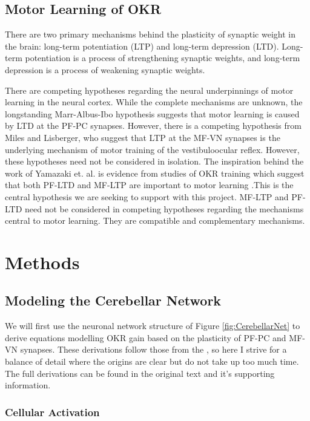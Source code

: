 \documentclass[10pt]{article}
\begin{document}
\subsection{Motor Learning of OKR}

There are two primary mechanisms behind the plasticity of synaptic weight in the brain: long-term potentiation (LTP) and long-term depression (LTD). Long-term potentiation is a process of strengthening synaptic weights, and long-term depression is a process of weakening synaptic weights.

There are competing hypotheses regarding the neural underpinnings of motor learning in the neural cortex.  While the complete mechanisms are unknown, the longstanding Marr-Albus-Ibo hypothesis suggests that motor learning is caused by LTD at the PF-PC synapses. However, there is a competing hypothesis from Miles and Lisberger, who suggest that LTP at the MF-VN synapses is the underlying mechanism of motor training of the vestibuloocular reflex. However, these hypotheses need not be considered in isolation. The inspiration behind the work of Yamazaki et. al. is evidence from studies of OKR training which suggest that both PF-LTD and MF-LTP are important to motor learning \cite{yamazaki2015modeling}.This is the central hypothesis we are seeking to support with this project. MF-LTP and PF-LTD need not be considered in competing hypotheses regarding the mechanisms central to motor learning. They are compatible and complementary mechanisms.

\section{Methods}

\subsection{Modeling the Cerebellar Network}

We will first use the neuronal network structure of Figure \ref{fig:CerebellarNet} to derive equations modelling OKR gain based on the plasticity of PF-PC and MF-VN synapses. These derivations follow those from the \cite{yamazaki2015modeling}, so here I strive for a balance of detail where the origins are clear but do not take up too much time. The full derivations can be found in the original text and it's supporting information.

\subsubsection{Cellular Activation}
\end{document}
